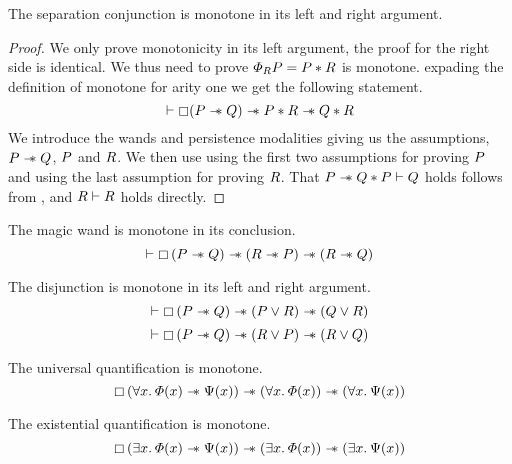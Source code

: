 \documentclass[thesis.tex]{subfiles}
\begin{document}
\begin{lemma}
    \label{lem:sepmono}
    The separation conjunction is monotone in its left and right argument.
\end{lemma}
\begin{proof}
    We only prove monotonicity in its left argument, the proof for the right side is identical.
    We thus need to prove $\varPhi_RP = P * R$ is monotone.
    expading the definition of monotone for arity one we get the following statement.
    \[\vdash \mathop{\boxempty}(P \mathrel{-\!\!\ast} Q) \mathrel{-\!\!\ast} P * R \mathrel{-\!\!\ast} Q * R\]
    We introduce the wands and persistence modalities giving us the assumptions, $P\mathrel{-\!\!\ast}Q$, $P$ and $R$.
    We then use  using the first two assumptions for proving $P$ and using the last assumption for proving $R$.
    That $P \mathrel{-\!\!\ast} Q * P \vdash Q$ holds follows from , and $R \vdash R$ holds directly.
\end{proof}
\begin{lemma}
    \label{lem:wandconcmono}
    The magic wand is monotone in its conclusion.
    \[\proves\always{(\prop\wand\propB)}\wand(\propC\wand\prop)\wand(\propC\wand\propB)\]
\end{lemma}
\begin{lemma}
    \label{lem:disjmono}
    The disjunction is monotone in its left and right argument.
    \[\vdash\mathop{\boxempty}{(P\mathrel{-\!\!\ast}Q)}\mathrel{-\!\!\ast}(P\lor R)\mathrel{-\!\!\ast}(Q\lor R)\]
    \[\vdash\mathop{\boxempty}{(P\mathrel{-\!\!\ast}Q)}\mathrel{-\!\!\ast}(R\lor P)\mathrel{-\!\!\ast}(R\lor Q)\]
\end{lemma}
\begin{lemma}
    \label{lem:allmono}
    The universal quantification is monotone.
    \[
        \always{(\All \var. \pred(\var) \wand \predB(\var))} \wand (\All\var.\pred(\var)) \wand (\All\var.\predB(\var))
    \]
\end{lemma}

\begin{lemma}
    \label{lem:eximono}
    The existential quantification is monotone.
    \[
        \always{(\Exists \var. \pred(\var) \wand \predB(\var))} \wand (\Exists\var.\pred(\var)) \wand (\Exists\var.\predB(\var))
    \]
\end{lemma}
\end{document}
